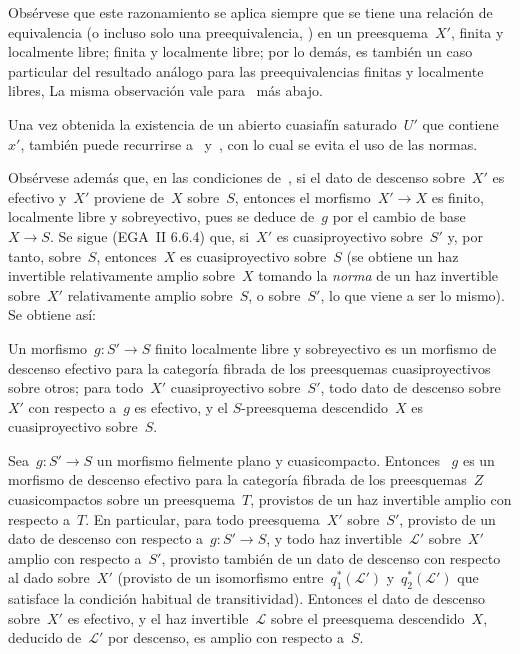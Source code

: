 Obsérvese que este razonamiento se aplica siempre que se tiene una relación
de equivalencia (o incluso solo una preequivalencia, \cf \cite{VIII.3}) en un
preesquema~$X'$, 
{finita y localmente libre;}
{finita y localmente libre;}
por lo demás,  es también un caso particular del resultado
análogo para las preequivalencias finitas y localmente libres, \cf \loccit
La misma observación vale para~ más abajo.

Una vez obtenida la existencia de un abierto cuasiafín saturado~$U'$ que
contiene~$x'$, también puede recurrirse a~
y~, con lo cual se evita el uso de las normas.

Obsérvese además que, en las condiciones de~, si el dato de
descenso sobre~$X'$ es efectivo y~$X'$ proviene de~$X$ sobre~$S$, entonces
el morfismo~$X'\to X$ es finito, localmente libre y sobreyectivo, pues se
deduce de~$g$ por el cambio de base~$X\to S$. Se sigue (EGA~II 6.6.4) que,
si~$X'$ es cuasiproyectivo sobre~$S'$ y, por tanto, sobre~$S$, entonces~$X$
es cuasiproyectivo sobre~$S$ (se obtiene un haz invertible relativamente
amplio sobre~$X$ tomando la \emph{norma} de un haz invertible sobre~$X'$
relativamente amplio sobre~$S$, o sobre~$S'$, lo que viene a ser lo mismo).
Se obtiene así:

\begin{corollaire}
\label{VIII.7.7}
Un morfismo~$g\colon S'\to S$ finito localmente libre y sobreyectivo es un
morfismo de descenso efectivo para la categoría fibrada de los preesquemas
cuasiproyectivos sobre otros; \ie para todo~$X'$ cuasiproyectivo sobre~$S'$,
todo dato de descenso sobre~$X'$ con respecto a~$g$ es efectivo, y el
$S$-preesquema descendido~$X$ es cuasiproyectivo sobre~$S$.
\end{corollaire}

\begin{proposition}
\label{VIII.7.8}
Sea~$g\colon S'\to S$ un morfismo fielmente plano y cuasicompacto. Entonces
~$g$ es un morfismo de descenso efectivo para la categoría fibrada de los
preesquemas~$Z$ cuasicompactos sobre un preesquema~$T$, provistos de un haz
invertible amplio
con respecto a~$T$. En particular, para todo preesquema~$X'$ sobre~$S'$,
provisto de un dato de descenso con respecto a~$g\colon S'\to S$, y todo haz
invertible~$\mathcal{L}'$ sobre~$X'$ amplio con respecto a~$S'$, provisto
también de un dato de descenso con respecto al dado sobre~$X'$ (\ie provisto
de un isomorfismo entre~$q_{1}^*(\mathcal{L}')$ y~$q_{2}^*(\mathcal{L}')$ que
satisface la condición habitual de transitividad). Entonces el dato de
descenso sobre~$X'$ es efectivo, y el haz invertible~$\mathcal{L}$ sobre el
preesquema descendido~$X$, deducido de~$\mathcal{L}'$ por descenso, es
amplio con respecto a~$S$.
\end{proposition}

